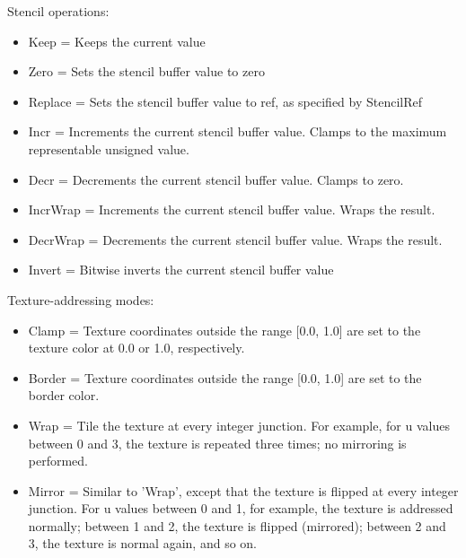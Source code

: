 Stencil operations:\\
\begin{itemize}
\item{Keep     = Keeps the current value}
\item{Zero     = Sets the stencil buffer value to zero}
\item{Replace  = Sets the stencil buffer value to ref, as specified by StencilRef}
\item{Incr     = Increments the current stencil buffer value. Clamps to the maximum representable unsigned value.}
\item{Decr     = Decrements the current stencil buffer value. Clamps to zero.}
\item{IncrWrap = Increments the current stencil buffer value. Wraps the result.}
\item{DecrWrap = Decrements the current stencil buffer value. Wraps the result.}
\item{Invert   = Bitwise inverts the current stencil buffer value}
\end{itemize}


Texture-addressing modes:\\
\begin{itemize}
\item{Clamp  = Texture coordinates outside the range [0.0, 1.0] are set to the texture color
               at 0.0 or 1.0, respectively.}
\item{Border = Texture coordinates outside the range [0.0, 1.0] are set to the border color.}
\item{Wrap   = Tile the texture at every integer junction. For example, for u values between
               0 and 3, the texture is repeated three times; no mirroring is performed.}
\item{Mirror = Similar to 'Wrap', except that the texture is flipped at every integer junction.
               For u values between 0 and 1, for example, the texture is addressed normally;
               between 1 and 2, the texture is flipped (mirrored); between 2 and 3, the texture is normal again, and so on.}
\end{itemize}
  

